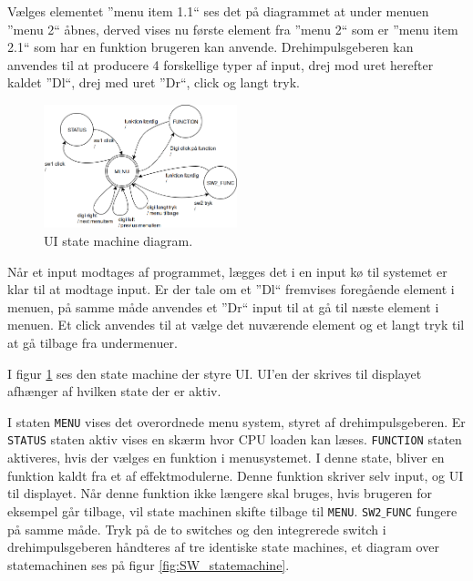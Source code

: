 Vælges elementet ''menu item 1.1`` ses det på diagrammet at under menuen ''menu 2`` åbnes, derved vises nu første element fra ''menu 2`` som er ''menu item 2.1`` som har en funktion brugeren kan anvende.
Drehimpulsgeberen kan anvendes til at producere 4 forskellige typer af input, drej mod uret herefter kaldet ''Dl``, drej med uret ''Dr``, click og langt tryk.


\begin{figure} 
	\centering 
	\includegraphics[width= 0.5\textwidth]{billeder/ui_statemachine.png} 
	\caption{UI state machine diagram. } 
	\label{fig:uistatemachine} 
\end{figure}

Når et input  modtages af programmet, lægges det i en input kø til systemet er klar til at modtage input. Er der tale om et ''Dl`` fremvises foregående element i menuen, på samme måde anvendes et ''Dr`` input til at gå til næste element i menuen. Et click anvendes til at vælge det nuværende element og et langt tryk til at gå tilbage fra undermenuer.

I figur \ref{fig:uistatemachine} ses den state machine der styre UI.
UI'en der skrives til displayet afhænger af hvilken state der er aktiv.

I staten \texttt{MENU} vises det overordnede menu system, styret af drehimpulsgeberen. 
Er \texttt{STATUS} staten aktiv vises en skærm hvor CPU loaden kan læses.
\texttt{FUNCTION} staten aktiveres, hvis der vælges en funktion i menusystemet. 
I denne state, bliver en funktion kaldt fra et af effektmodulerne. 
Denne funktion skriver selv input, og  UI til displayet.
Når denne funktion ikke længere skal bruges, hvis brugeren for eksempel går tilbage, vil state machinen skifte tilbage til \texttt{MENU}.
\texttt{SW2$\_$FUNC} fungere på samme måde. \newline
Tryk på de to switches og den integrerede switch i drehimpulsgeberen håndteres af tre identiske state machines, et diagram over statemachinen ses på figur \ref{fig:SW_statemachine}.

